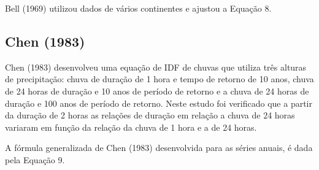 Bell (1969) utilizou dados de vários continentes e ajustou a Equação 8.

\subsection{Chen (1983)}

Chen (1983) desenvolveu uma equação de IDF de chuvas que utiliza três alturas de precipitação: chuva de duração de 1 hora e tempo de retorno de 10 anos, chuva de 24 horas de duração e 10 anos de período de retorno e a chuva de 24 horas de duração e 100 anos de período de retorno. Neste estudo foi verificado que a partir da duração de 2 horas as relações de duração em relação a chuva de 24 horas variaram em função da relação da chuva de 1 hora e a de 24 horas.

A fórmula generalizada de Chen (1983) desenvolvida para as séries anuais, é dada pela Equação 9.